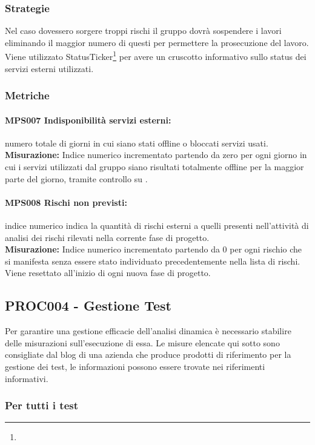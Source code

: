 \documentclass[NormeDiProgetto.tex]{subfiles}
\begin{document}
	\subsubsection{Strategie}
	Nel caso dovessero sorgere troppi rischi il gruppo dovrà sospendere i lavori eliminando il maggior numero di questi per permettere la prosecuzione del lavoro.
	Viene utilizzato StatusTicker\footnote{} per avere un cruscotto informativo sullo status dei servizi esterni utilizzati.
	
	\subsubsection{Metriche}
	\paragraph{MPS007 Indisponibilità servizi esterni:} numero totale di giorni in cui siano stati offline o bloccati servizi usati.\\
	\textbf{Misurazione:}
	Indice numerico incrementato partendo da zero per ogni giorno in cui i servizi utilizzati dal gruppo siano risultati totalmente offline per la maggior parte del giorno, tramite controllo su .
	
	\paragraph{MPS008 Rischi non previsti:} indice numerico indica la quantità di rischi esterni a quelli presenti nell'attività di analisi dei rischi rilevati nella corrente fase di progetto. \\
	\textbf{Misurazione:}
	Indice numerico incrementato partendo da 0 per ogni rischio che si manifesta senza essere stato individuato precedentemente nella lista di rischi.
	Viene resettato all'inizio di ogni nuova fase di progetto.
	
	\subsection{PROC004 - Gestione Test}	
	Per garantire una gestione efficacie dell'analisi dinamica è necessario stabilire delle misurazioni sull'esecuzione di essa.
	Le misure elencate qui sotto sono consigliate dal blog di una azienda che produce prodotti di riferimento per la gestione dei test, le informazioni possono essere trovate nei riferimenti informativi.
	\subsubsection{Per tutti i test}
\end{document}
